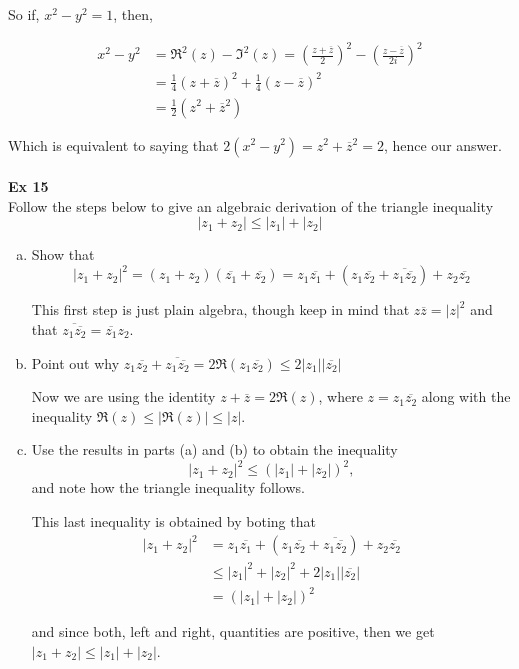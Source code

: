 So if, $x^2 - y^2 = 1$, then,

\begin{align*}
x^2 - y^2 &= \Re^2 (z) - \Im^2 (z) = \left(\frac{z+\overline{z}}{2}\right)^2 - \left(\frac{z-\overline{z}}{2i}\right)^2 \\
&= \frac{1}{4}\left(z+\overline{z}\right)^2 + \frac{1}{4}\left(z-\overline{z}\right)^2 \\
&= \frac{1}{2} \left(z^2 + \overline{z}^2\right)
\end{align*}

Which is equivalent to saying that $2\left(x^2 - y^2\right) = z^2 + \overline{z}^2 = 2$, hence our answer.
\\~\\



\textbf{Ex 15}
\\

Follow the steps below to give an algebraic derivation of the triangle inequality
$$
\left| z_1 + z_2 \right| \leq |z_1| + |z_2|
$$

\begin{enumerate}[(a)]
\item Show that
$$
\left| z_1 + z_2 \right|^2 =
\left(z_1 + z_2\right)\left(\overline{z_1} + \overline{z_2}\right) =
z_1 \overline{z_1} + \left(z_1 \overline{z_2} + \overline{z_1 \overline{z_2}}\right) + z_2 \overline{z_2}
$$

This first step is just plain algebra, though keep in mind that $z\overline{z} = |z|^2$ and that
$\overline{z_1 \overline{z_2}} = \overline{z_1} z_2$.

\item Point out why $z_1 \overline{z_2} + \overline{z_1 \overline{z_2}} = 2 \Re\left(z_1 \overline{z_2}\right) \leq 2|z_1| |\overline{z_2}|$

Now we are using the identity $z+\overline{z} = 2\Re(z)$, where $z = z_1 \overline{z_2}$
along with the inequality $\Re(z) \leq \left|\Re(z)\right| \leq |z|$.

\item Use the results in parts (a) and (b) to obtain the inequality
$$
\left| z_1 + z_2 \right|^2 \leq \left( |z_1| + |z_2| \right)^2,
$$
and note how the triangle inequality follows.

This last inequality is obtained by boting that
\begin{align*}
\left| z_1 + z_2 \right|^2 &=
    z_1 \overline{z_1} + \left(z_1 \overline{z_2} + \overline{z_1 \overline{z_2}}\right) + z_2 \overline{z_2} \\
&\leq |z_1|^2 + |z_2|^2 + 2|z_1| |\overline{z_2}| \\
&= \left( |z_1| + |z_2| \right)^2
\end{align*}

and since both, left and right, quantities are positive, then we get $\left| z_1 + z_2 \right| \leq |z_1| + |z_2|$.

\end{enumerate}

